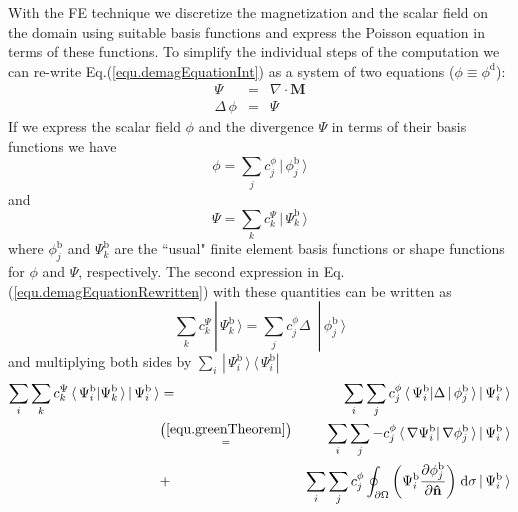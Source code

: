 \documentclass[11pt]{article}
\renewcommand{\d}{\mathrm{d}} %
\newcommand{\rv}[1]{\ensuremath{\mathbf{#1}}} %
\newcommand{\vc}[1]{\,|\,#1 \, \rangle}
\newcommand{\ivc}[1]{\,\langle\,#1|}
\begin{document}
With the FE technique we discretize the magnetization and the scalar
field on the domain using suitable basis functions and express the 
Poisson equation in terms of these functions. To simplify the individual
steps of the computation we can re-write
Eq.(\ref{equ.demagEquationInt}) as a system of two equations ($\phi
\equiv \phi^\mathrm{d}$): 
\begin{eqnarray}
  \Psi & = & \nabla \cdot \rv{M} 
  \label{equ.demagEquationRewritten} \\
  \Delta \, \phi & = & \Psi  \nonumber
\end{eqnarray}
If we express the scalar field $\phi$ and the divergence $\Psi$
in terms of their basis functions we have
\begin{equation}
\phi = \sum_j c^\phi_j \vc{\phi^\mathrm{b}_{j}}
\label{equ.scalarFieldBasisFunctions}
\end{equation}
and 
\begin{equation}
\Psi = \sum_k c^\Psi_k \vc{\Psi^\mathrm{b}_{k}} 
\label{equ.magnetBasisFunctions}
\end{equation}
where $\phi^\mathrm{b}_{j}$ and $\Psi^\mathrm{b}_{k}$ are the ``usual"
finite element basis functions or shape functions for
$\phi$ and $\Psi$, respectively.  
The second expression in Eq.(\ref{equ.demagEquationRewritten}) with
  these quantities can be written as 
\begin{equation}
  \sum_k c^\Psi_k \vc{\Psi^\mathrm{b}_{k}}  = \sum_j c^\phi_j \Delta \,
    \, \vc{\phi^\mathrm{b}_{j}}
  \label{equ.poissonBasisFunctions}
\end{equation}
and multiplying both sides by $\sum_i
\vc{\Psi^\mathrm{b}_{i}}\ivc{\Psi^\mathrm{b}_{i}}$  
\begin{eqnarray}
  \sum_i \sum_k c^\Psi_k \ivc{\Psi^\mathrm{b}_{i}} \Psi^\mathrm{b}_{k}
  \,\rangle \vc{\Psi^\mathrm{b}_{i}}
  \nonumber &=&
  \sum_i \sum_j
  c^\phi_j \ivc{\Psi^\mathrm{b}_{i}} \Delta \, | \,
  \phi^\mathrm{b}_{j} \,\rangle \vc{\Psi^\mathrm{b}_{i}}
  \nonumber \\&\substack{\left(\ref{equ.greenTheorem}\right) \\ =}&
  \sum_i \sum_j
  - c^\phi_j \ivc{ \nabla \Psi^\mathrm{b}_{i}} \, 
  \nabla \phi^\mathrm{b}_{j} \,\rangle  \vc{\Psi^\mathrm{b}_{i}}
  \nonumber \\ &+& 
  \sum_i \sum_j c^\phi_j \oint_{\partial \Omega} \bigg( \Psi^\mathrm{b}_{i}
  \frac{\partial \phi^\mathrm{b}_{j}}{ \partial \rv{\hat{n}}} \bigg)
  \;  \d\sigma  
  \vc{\Psi^\mathrm{b}_{i}}
  \label{equ.relationBeetweenCoefficients}
\end{eqnarray}
\end{document}

